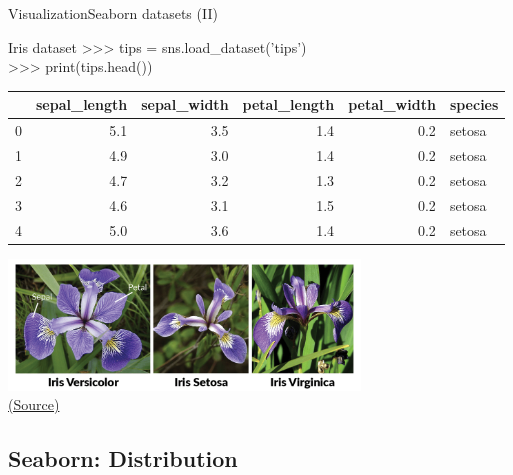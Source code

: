 \documentclass[10pt,compress]{beamer} %
\begin{document}
\begin{frame}[fragile]{Visualization}{Seaborn datasets (II)}
	\footnotesize{
	\begin{exampleblock}{\footnotesize{Iris dataset}}
	>>> tips = sns.load\_dataset('tips')\\
	>>> print(tips.head())\\
	\begin{tabular}{lrrrrl}
	\hline
	{} &  sepal\_length &  sepal\_width &  petal\_length &  petal\_width & species \\
	\hline
	0 &           5.1 &          3.5 &           1.4 &          0.2 &  setosa \\
	1 &           4.9 &          3.0 &           1.4 &          0.2 &  setosa \\
	2 &           4.7 &          3.2 &           1.3 &          0.2 &  setosa \\
	3 &           4.6 &          3.1 &           1.5 &          0.2 &  setosa \\
	4 &           5.0 &          3.6 &           1.4 &          0.2 &  setosa \\
	\hline
	\end{tabular}
	\end{exampleblock}
	}

	\centering \includegraphics[width=0.7\textwidth]{figs/iris-machinelearning.png}\\
	\centering \href{http://www.lac.inpe.br/~rafael.santos/Docs/R/CAP394/WholeStory-Iris.html}{(Source)}
\end{frame}

\subsection{Seaborn: Distribution}
\end{document}
